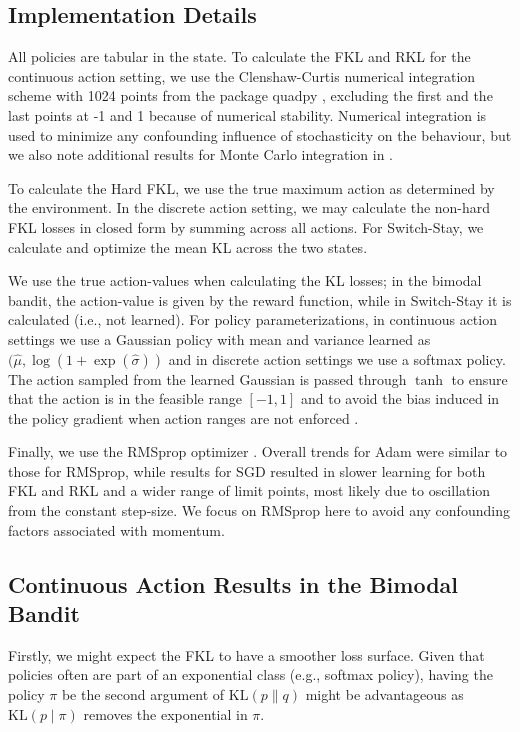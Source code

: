\documentclass[twoside,11pt]{article}
\newcommand{\KL}{\mathrm{KL}}
\begin{document}
\subsection{Implementation Details}
\noindent All policies are tabular in the state. To calculate the FKL and RKL for the continuous action setting, we use the Clenshaw-Curtis \citep{clenshaw1960method} numerical integration scheme with 1024 points from the package quadpy \citep{schlomerquadpy}, excluding the first and the last points at -1 and 1 because of numerical stability. Numerical integration is used to minimize any confounding influence of stochasticity on the behaviour, but we also note additional results for Monte Carlo integration in .

To calculate the Hard FKL, we use the true maximum action as determined by the environment. In the discrete action setting, we may calculate the non-hard FKL losses in closed form by summing across all actions. For Switch-Stay, we calculate and optimize the mean KL across the two states.

We use the true action-values when calculating the KL losses; in the bimodal bandit, the action-value is given by the reward function, while in Switch-Stay it is calculated (i.e., not learned). For policy parameterizations, in continuous action settings we use a Gaussian policy with mean and variance learned as $(\hat{\mu}, \log(1+\exp(\hat{\sigma}))$ and in discrete action settings we use a softmax policy. The action sampled from the learned Gaussian is passed through $\tanh$ to ensure that the action is in the feasible range $[-1, 1]$ and to avoid the bias induced in the policy gradient when action ranges are not enforced \citep{chou2017improving}. 

Finally, we use the RMSprop optimizer \citep{tieleman2012lecture}. Overall trends for Adam \citep{kingma2014adam} were similar to those for RMSprop, while results for SGD resulted in slower learning for both FKL and RKL and a wider range of limit points, most likely due to oscillation from the constant step-size. We focus on RMSprop here to avoid any confounding factors associated with momentum. 


\subsection{Continuous Action Results in the Bimodal Bandit}
Firstly, we might expect the FKL to have a smoother loss surface. Given that policies often are part of an exponential class (e.g., softmax policy), having the policy $\pi$ be the second argument of $\KL(p \parallel q)$ might be advantageous as $\KL(p \mid \pi)$ removes the exponential in $\pi$. 
\end{document}
